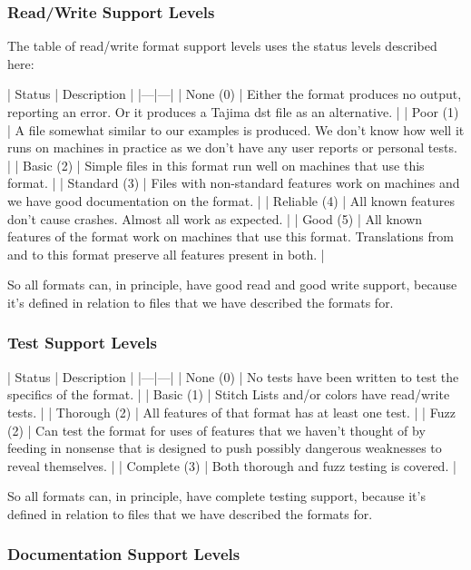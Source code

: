 \documentclass[a4paper, 11pt]{report}
\begin{document}
\subsubsection{Read/Write Support Levels}

The table of read/write format support levels uses the status levels described here:

| Status | Description |
|---|---|
| None (0) | Either the format produces no output, reporting an error. Or it produces a Tajima dst file as an alternative. |
| Poor (1) | A file somewhat similar to our examples is produced. We don't know how well it runs on machines in practice as we don't have any user reports or personal tests. |
| Basic (2) | Simple files in this format run well on machines that use this format. |
| Standard (3) | Files with non-standard features work on machines and we have good documentation on the format. |
| Reliable (4) | All known features don't cause crashes. Almost all work as expected. |
| Good (5) | All known features of the format work on machines that use this format. Translations from and to this format preserve all features present in both. |

So all formats can, in principle, have good read and good write support, because it's defined in relation to files that we have described the formats for.

\subsubsection{Test Support Levels}

| Status | Description |
|---|---|
| None (0) | No tests have been written to test the specifics of the format. |
| Basic (1) | Stitch Lists and/or colors have read/write tests. |
| Thorough (2) | All features of that format has at least one test. |
| Fuzz (2) | Can test the format for uses of features that we haven't thought of by feeding in nonsense that is designed to push possibly dangerous weaknesses to reveal themselves. |
| Complete (3) | Both thorough and fuzz testing is covered. |

So all formats can, in principle, have complete testing support, because it's defined in relation to files that we have described the formats for.

\subsubsection{Documentation Support Levels}
\end{document}
